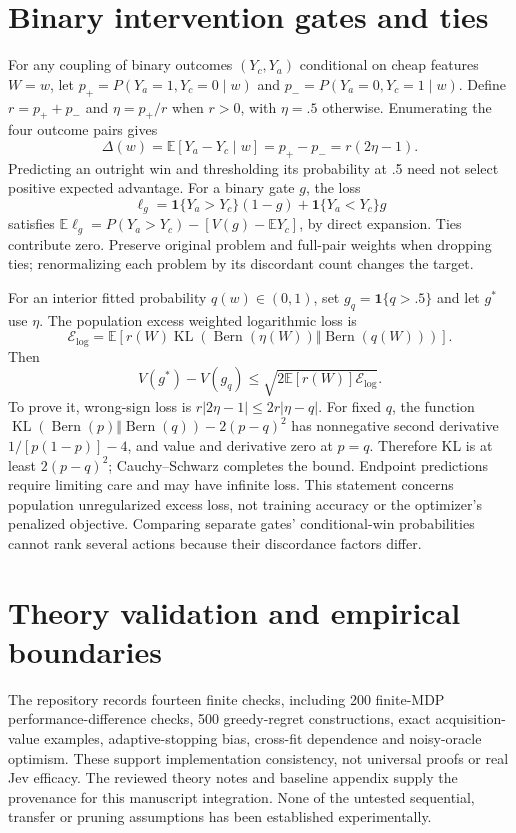 \documentclass[11pt]{article}
\begin{document}
\section{Binary intervention gates and ties}
For any coupling of binary outcomes $(Y_c,Y_a)$ conditional on cheap features $W=w$, let $p_+=P(Y_a=1,Y_c=0\mid w)$ and $p_-=P(Y_a=0,Y_c=1\mid w)$. Define $r=p_++p_-$ and $\eta=p_+/r$ when $r>0$, with $\eta=.5$ otherwise. Enumerating the four outcome pairs gives
\[
\Delta(w)=\mathbb E[Y_a-Y_c\mid w]=p_+-p_-=r(2\eta-1).
\]
Predicting an outright win and thresholding its probability at .5 need not select positive expected advantage. For a binary gate $g$, the loss
\[
\ell_g=\mathbf1\{Y_a>Y_c\}(1-g)+\mathbf1\{Y_a<Y_c\}g
\]
satisfies $\mathbb E\ell_g=P(Y_a>Y_c)-[V(g)-\mathbb E Y_c]$, by direct expansion. Ties contribute zero. Preserve original problem and full-pair weights when dropping ties; renormalizing each problem by its discordant count changes the target.

For an interior fitted probability $q(w)\in(0,1)$, set $g_q=\mathbf1\{q>.5\}$ and let $g^*$ use $\eta$. The population excess weighted logarithmic loss is
\[
\mathcal E_{\log}=\mathbb E[r(W)\operatorname{KL}(\operatorname{Bern}(\eta(W))\Vert\operatorname{Bern}(q(W)))].
\]
Then
\[
V(g^*)-V(g_q)\leq\sqrt{2\mathbb E[r(W)]\mathcal E_{\log}}.
\]
To prove it, wrong-sign loss is $r|2\eta-1|\leq2r|\eta-q|$. For fixed $q$, the function $\operatorname{KL}(\operatorname{Bern}(p)\Vert\operatorname{Bern}(q))-2(p-q)^2$ has nonnegative second derivative $1/[p(1-p)]-4$, and value and derivative zero at $p=q$. Therefore KL is at least $2(p-q)^2$; Cauchy--Schwarz completes the bound. Endpoint predictions require limiting care and may have infinite loss. This statement concerns population unregularized excess loss, not training accuracy or the optimizer's penalized objective. Comparing separate gates' conditional-win probabilities cannot rank several actions because their discordance factors differ.

\section{Theory validation and empirical boundaries}
The repository records fourteen finite checks, including 200 finite-MDP performance-difference checks, 500 greedy-regret constructions, exact acquisition-value examples, adaptive-stopping bias, cross-fit dependence and noisy-oracle optimism. These support implementation consistency, not universal proofs or real Jev efficacy. The reviewed theory notes and baseline appendix supply the provenance for this manuscript integration. None of the untested sequential, transfer or pruning assumptions has been established experimentally.
\end{document}
